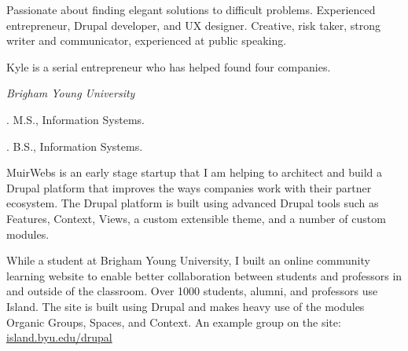 \documentclass[11pt]{article}
\begin{document}
\medskip

\reversemarginpar

\medskip       

\medskip
{}

\noindent Passionate about finding elegant solutions to difficult problems. Experienced entrepreneur, Drupal developer, and UX designer. Creative, risk taker, strong writer and communicator, experienced at public speaking.

\medskip

\ind Kyle is a serial entrepreneur who has helped found four companies.

\bigskip



\noindent\emph{Brigham Young University \vspace{0.15in}}

. M.S., Information Systems.

. B.S., Information Systems.

\bigskip
 
\medskip


\noindent MuirWebs is an early stage startup that I am helping to architect and build a Drupal platform that improves the ways companies work with their partner ecosystem. The Drupal platform is built using advanced Drupal tools such as Features, Context, Views, a custom extensible theme, and a number of custom modules.

\bigskip


\noindent While a student at Brigham Young University, I built an online community learning website to enable better collaboration between students and professors in and outside of the classroom. Over 1000 students, alumni, and professors use Island. The site is built using Drupal and makes heavy use of the modules Organic Groups, Spaces, and Context. An example group on the site: \href{https://island.byu.edu/drupal}{island.byu.edu/drupal}
\end{document}
